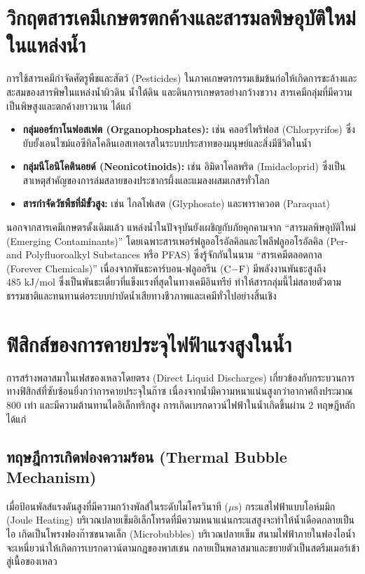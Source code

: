 \clearpage


\section{วิกฤตสารเคมีเกษตรตกค้างและสารมลพิษอุบัติใหม่ในแหล่งน้ำ}

การใช้สารเคมีกำจัดศัตรูพืชและสัตว์ (Pesticides) ในภาคเกษตรกรรมเข้มข้นก่อให้เกิดการชะล้างและสะสมของสารพิษในแหล่งน้ำผิวดิน น้ำใต้ดิน และดินการเกษตรอย่างกว้างขวาง สารเคมีกลุ่มที่มีความเป็นพิษสูงและตกค้างยาวนาน ได้แก่
\begin{itemize}
    \item \textbf{กลุ่มออร์กาโนฟอสเฟต (Organophosphates):} เช่น คลอร์ไพริฟอส (Chlorpyrifos) ซึ่งยับยั้งเอนไซม์แอซีทิลโคลีนเอสเทอเรสในระบบประสาทของมนุษย์และสิ่งมีชีวิตในน้ำ
    \item \textbf{กลุ่มนีโอนิโคตินอยด์ (Neonicotinoids):} เช่น อิมิดาโคลพริด (Imidacloprid) ซึ่งเป็นสาเหตุสำคัญของการล่มสลายของประชากรผึ้งและแมลงผสมเกสรทั่วโลก
    \item \textbf{สารกำจัดวัชพืชที่มีขั้วสูง:} เช่น ไกลโฟเสต (Glyphosate) และพาราควอต (Paraquat)
\end{itemize}

นอกจากสารเคมีเกษตรดั้งเดิมแล้ว แหล่งน้ำในปัจจุบันยังเผชิญกับภัยคุกคามจาก ``สารมลพิษอุบัติใหม่ (Emerging Contaminants)'' โดยเฉพาะสารเพอร์ฟลูออโรอัลคิลและโพลีฟลูออโรอัลคิล (Per- and Polyfluoroalkyl Substances หรือ PFAS) ซึ่งรู้จักกันในนาม ``สารเคมีตลอดกาล (Forever Chemicals)'' เนื่องจากพันธะคาร์บอน-ฟลูออรีน ($\ce{C-F}$) มีพลังงานพันธะสูงถึง $485 \text{ kJ/mol}$ ซึ่งเป็นพันธะเดี่ยวที่แข็งแรงที่สุดในทางเคมีอินทรีย์ ทำให้สารกลุ่มนี้ไม่สลายตัวตามธรรมชาติและทนทานต่อระบบบำบัดน้ำเสียทางชีวภาพและเคมีทั่วไปอย่างสิ้นเชิง

\section{ฟิสิกส์ของการคายประจุไฟฟ้าแรงสูงในน้ำ}

การสร้างพลาสมาในเฟสของเหลวโดยตรง (Direct Liquid Discharges) เกี่ยวข้องกับกระบวนการทางฟิสิกส์ที่ซับซ้อนยิ่งกว่าการคายประจุในก๊าซ เนื่องจากน้ำมีความหนาแน่นสูงกว่าอากาศถึงประมาณ 800 เท่า และมีความต้านทานไดอิเล็กทริกสูง การเกิดเบรกดาวน์ไฟฟ้าในน้ำเกิดขึ้นผ่าน 2 ทฤษฎีหลัก ได้แก่

\subsection{ทฤษฎีการเกิดฟองความร้อน (Thermal Bubble Mechanism)}
เมื่อป้อนพัลส์แรงดันสูงที่มีความกว้างพัลส์ในระดับไมโครวินาที ($\mu\text{s}$) กระแสไฟฟ้าแบบโอห์มมิก (Joule Heating) บริเวณปลายเข็มอิเล็กโทรดที่มีความหนาแน่นกระแสสูงจะทำให้น้ำเดือดกลายเป็นไอ เกิดเป็นโพรงฟองก๊าซขนาดเล็ก (Microbubbles) บริเวณปลายเข็ม สนามไฟฟ้าภายในฟองไอน้ำจะเหนี่ยวนำให้เกิดการเบรกดาวน์ตามกฎของพาสเชน กลายเป็นพลาสมาและขยายตัวเป็นสตรีมเมอร์เข้าสู่เนื้อของเหลว

